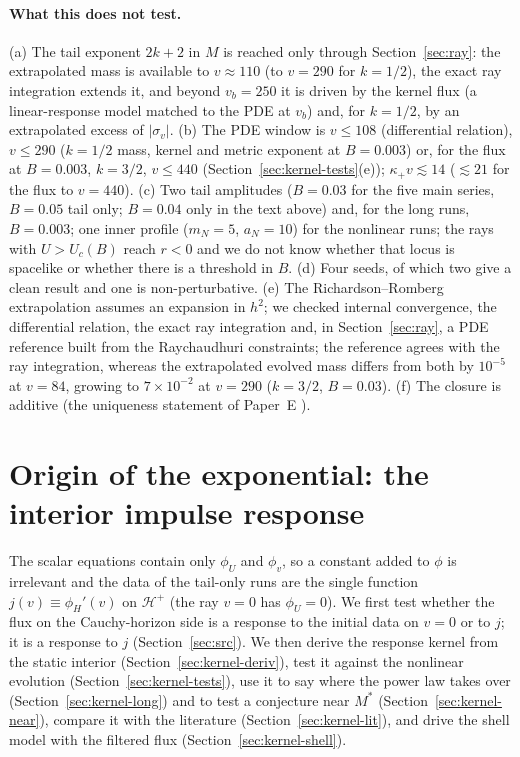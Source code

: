 \documentclass[11pt]{article}
\begin{document}
\paragraph{What this does not test.} (a) The tail exponent $2k+2$ in $M$ is reached only through Section~\ref{sec:ray}: the extrapolated mass is available to $v\approx110$ (to $v=290$ for $k=1/2$), the exact ray integration extends it, and beyond $v_b=250$ it is driven by the kernel flux (a linear-response model matched to the PDE at $v_b$) and, for $k=1/2$, by an extrapolated excess of $|\sigma_v|$. (b) The PDE window is $v\le108$ (differential relation), $v\le290$ ($k=1/2$ mass, kernel and metric exponent at $B=0.003$) or, for the flux at $B=0.003$, $k=3/2$, $v\le440$ (Section~\ref{sec:kernel-tests}(e)); $\kappa_+v\lesssim14$ ($\lesssim21$ for the flux to $v=440$). (c) Two tail amplitudes ($B=0.03$ for the five main series, $B=0.05$ tail only; $B=0.04$ only in the text above) and, for the long runs, $B=0.003$; one inner profile ($m_N=5$, $a_N=10$) for the nonlinear runs; the rays with $U>U_c(B)$ reach $r<0$ and we do not know whether that locus is spacelike or whether there is a threshold in $B$. (d) Four seeds, of which two give a clean result and one is non-perturbative. (e) The Richardson--Romberg extrapolation assumes an expansion in $h^2$; we checked internal convergence, the differential relation, the exact ray integration and, in Section~\ref{sec:ray}, a PDE reference built from the Raychaudhuri constraints; the reference agrees with the ray integration, whereas the extrapolated evolved mass differs from both by $10^{-5}$ at $v=84$, growing to $7\times10^{-2}$ at $v=290$ ($k=3/2$, $B=0.03$). (f) The closure is additive (the uniqueness statement of Paper~E \citep{PaperE}).

\section{Origin of the exponential: the interior impulse response}
\label{sec:kernel}

The scalar equations contain only $\phi_U$ and $\phi_v$, so a constant added to $\phi$ is irrelevant and the data of the tail-only runs are the single function $j(v)\equiv\phi_H'(v)$ on $\mathcal H^+$ (the ray $v=0$ has $\phi_U=0$). We first test whether the flux on the Cauchy-horizon side is a response to the initial data on $v=0$ or to $j$; it is a response to $j$ (Section~\ref{sec:src}). We then derive the response kernel from the static interior (Section~\ref{sec:kernel-deriv}), test it against the nonlinear evolution (Section~\ref{sec:kernel-tests}), use it to say where the power law takes over (Section~\ref{sec:kernel-long}) and to test a conjecture near $M^*$ (Section~\ref{sec:kernel-near}), compare it with the literature (Section~\ref{sec:kernel-lit}), and drive the shell model with the filtered flux (Section~\ref{sec:kernel-shell}).
\end{document}
